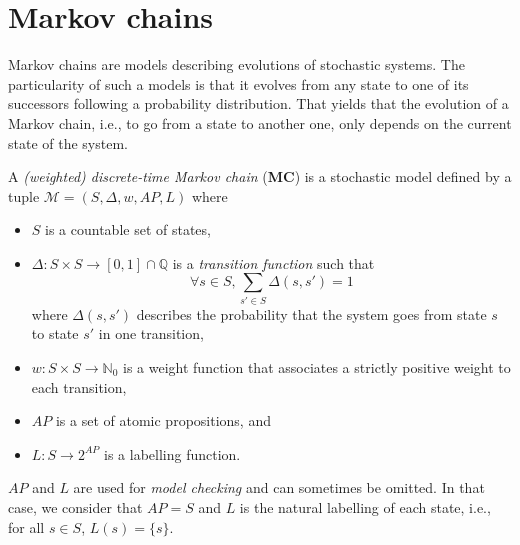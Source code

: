 \section{Markov chains}
Markov chains are models describing evolutions of stochastic systems.
The particularity of such a models is that it evolves from any state to one of its successors following a probability distribution.
That yields that the evolution of a Markov chain, i.e., to go from a state to another one, only depends on the current state of the system.
\begin{definition}
  A \textit{(weighted) discrete-time Markov chain} (\textbf{MC}) is a stochastic model defined by a tuple $\mathcal{M}=(S, \Delta, w, AP, L)$ where
	\begin{itemize}
		\item $S$ is a countable set of states,
		\item $\Delta: S \times S \rightarrow [0,1] \cap \mathbb{Q}$ is a  \textit{transition function} such that \[\forall s \in S, \sum_{s' \in S}\Delta(s, s')= 1\]
		where $\Delta(s, s')$ describes the probability that the system goes from state $s$ to state $s'$ in one transition,
    \item $w: S \times S \rightarrow \mathbb{N}_0$ %
      is a weight function that associates a strictly positive weight to each transition,
    \item $AP$ is a set of atomic propositions, and
    \item $L: S \rightarrow 2^{AP}$ is a labelling function.
	\end{itemize}
\end{definition}
\begin{remark}
  $AP$ and $L$ are used for \textit{model checking} and can sometimes be omitted. In that case, we consider that $AP = S$ and $L$ is the natural labelling of each state, i.e., for all $s \in S$, $L(s) = \{s\}$.
\end{remark}

